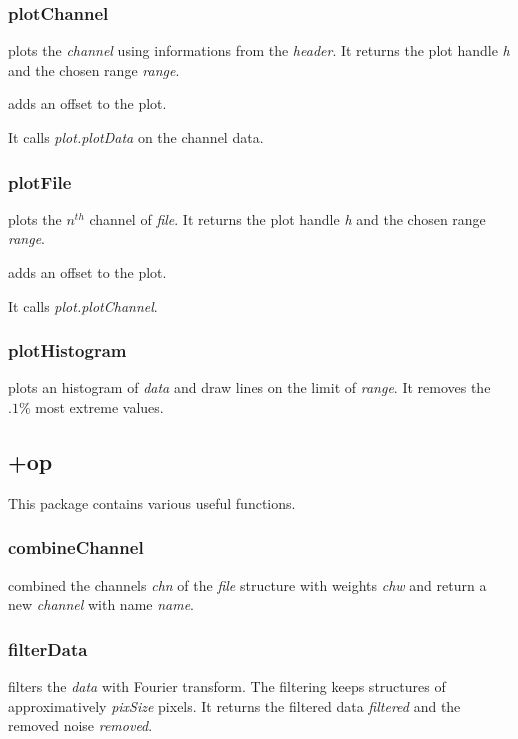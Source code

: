 \subsubsection{plotChannel}
\bdf
{} plots the \emph{channel} using informations from the \emph{header}. It returns the plot handle \emph{h} and the chosen range \emph{range}.

 adds an offset to the plot.
\edf

It calls \emph{plot.plotData} on the channel data.
\subsubsection{plotFile}

\bdf
{} plots the $n^{th}$ channel of \emph{file}. It returns the plot handle \emph{h} and the chosen range \emph{range}.

 adds an offset to the plot.
\edf

It calls \emph{plot.plotChannel}. 
\subsubsection{plotHistogram}
\bdf
{} plots an histogram of \emph{data} and draw lines on the limit of \emph{range}. It removes the $.1\%$ most extreme values. 
\edf

\subsection{+op}
This package contains various useful functions.
\subsubsection{combineChannel}
\bdf
{} combined the channels \emph{chn} of the \emph{file} structure with weights \emph{chw} and return a new \emph{channel} with name \emph{name}.
\edf
\subsubsection{filterData}
\bdf
{} filters the \emph{data} with Fourier transform. The filtering keeps structures of approximatively \emph{pixSize} pixels. It returns the filtered data \emph{filtered} and the removed noise \emph{removed}.

